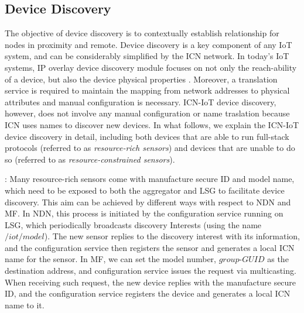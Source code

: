 \subsection{Device Discovery}
The objective of device discovery is to contextually establish relationship for nodes in proximity and remote. Device discovery is a key component of any IoT system, and can be considerably simplified by the ICN network. In today's IoT systems, IP overlay device discovery module focuses on not only the reach-ability of a device, but also the device physical properties \cite{iotivity,alljoyn}. Moreover, a translation service is required to maintain the mapping from network addresses to physical attributes and manual configuration is necessary. ICN-IoT  device discovery, however,  does not involve any manual configuration or name traslation because ICN uses names to discover new devices. In what follows, we explain the ICN-IoT device discovery  in detail, including both devices that are able to run  full-stack protocols (referred to as \emph{resource-rich sensors}) and devices that are unable to do so (referred to as \emph{resource-constrained sensors}).

\vspace{1mm}: Many resource-rich sensors come with manufacture secure ID and model name, which need to be exposed to both the aggregator and LSG to facilitate device discovery. This aim can be achieved by different ways with respect to NDN and MF.  In NDN, this process is initiated by the configuration service running on LSG, which periodically broadcasts discovery Interests (using the name $/iot/model$). The new sensor replies to the discovery interest with its information, and the configuration service then registers the sensor and generates a local ICN name for the sensor. In MF, we can set the model number, $group$-$GUID$ as the destination address, and configuration service issues the request via multicasting. When receiving such request, the new device replies with the manufacture secure ID, and the configuration service registers the device and  generates a local ICN name to it.



